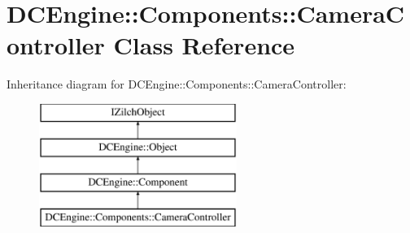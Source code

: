 \hypertarget{classDCEngine_1_1Components_1_1CameraController}{\section{D\-C\-Engine\-:\-:Components\-:\-:Camera\-Controller Class Reference}
\label{classDCEngine_1_1Components_1_1CameraController}
}
Inheritance diagram for D\-C\-Engine\-:\-:Components\-:\-:Camera\-Controller\-:\begin{figure}[H]
\begin{center}
\leavevmode
\includegraphics[height=4.000000cm]{classDCEngine_1_1Components_1_1CameraController}
\end{center}
\end{figure}
